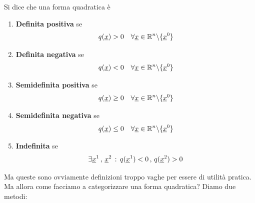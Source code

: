 Si dice che una forma quadratica è
\begin{enumerate}
	\item \textbf{Definita positiva} se
	\begin{align}
		q(\underline{x})>0 \quad \forall \underline{x} \in \mathbb{R}^n\backslash \{ \underline{x}^0 \}
	\end{align}
	\item \textbf{Definita negativa} se
	\begin{align}
		q(\underline{x})<0 \quad \forall \underline{x} \in \mathbb{R}^n\backslash \{ \underline{x}^0 \}
	\end{align}
	\item \textbf{Semidefinita positiva} se
	\begin{align}
		q(\underline{x})\geq 0 \quad \forall \underline{x} \in \mathbb{R}^n\backslash \{ \underline{x}^0 \}
	\end{align}
	\item \textbf{Semidefinita negativa} se
	\begin{align}
		q(\underline{x}) \leq 0 \quad \forall \underline{x} \in \mathbb{R}^n\backslash \{ \underline{x}^0 \}
	\end{align}
	\item \textbf{Indefinita} se
	\begin{align}
		\exists \underline{x}^1 \, , \, \underline{x}^2 \, : \, q(\underline{x}^1)<0 \, , \, q(\underline{x}^2)>0
	\end{align}
\end{enumerate}

Ma queste sono ovviamente definizioni troppo vaghe per essere di utilità pratica. Ma allora come facciamo a categorizzare una forma quadratica? Diamo due metodi:

